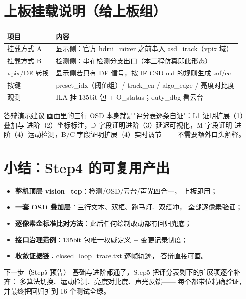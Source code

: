 \section{上板挂载说明（给上板组）}

\begin{center}
\begin{tabular}{ll}
\toprule
\rowcolor{rowtint}\textbf{项目} & \textbf{内容} \\
\midrule
挂载方式 A & 显示侧：官方 hdmi\_mixer 之前串入 osd\_track（vpix 域） \\
挂载方式 B & 检测侧：串在检测分支出口（本工程仿真即此形态） \\
vpix/DE 转换 & 显示侧若只有 DE 信号，按 IF-OSD.md 的规则生成 sof/eol \\
按键 & preset\_idx（阈值组）/ track\_en / algo\_edge / 亮度对比度 \\
观测 & ILA 挂 135bit 包 + O\_status；duty\_dbg 看云台 \\
\bottomrule
\end{tabular}
\end{center}

\begin{tipbox}{答辩演示建议}
画面里的三行 OSD 本身就是"评分表逐条自证"：L1 证明扩展（1）叠加与
进阶（2）坐标标注，D 字段证明进阶（3）延迟可视化，M 字段证明
进阶（4）运动检测，B/C 字段证明扩展（4）实时调节——
不需要额外口头解释。
\end{tipbox}

\section{小结：Step4 的可复用产出}

\begin{itemize}
  \item \textbf{整机顶层 vision\_top}：检测/OSD/云台/声光四合一，
    上板即用；
  \item \textbf{一套 OSD 叠加层}：三行文本、双框、跑马灯、双缓冲，
    全部逐像素验证；
  \item \textbf{逐像素金标准比对方法}：此后任何绘制改动都有回归兜底；
  \item \textbf{接口治理范例}：135bit 包唯一权威定义 + 变更记录制度；
  \item \textbf{收敛证据链}：closed\_loop\_trace.txt 逐帧轨迹，
    答辩直接可画。
\end{itemize}

\begin{okbox}{下一步（Step5 预告）}
基础与进阶都通了，Step5 把评分表剩下的扩展项逐个补齐：
多算法切换、运动检测、亮度对比度、声光反馈——
每个都带位精确验证，并最终把回归扩到 16 个测试全绿。
\end{okbox}

